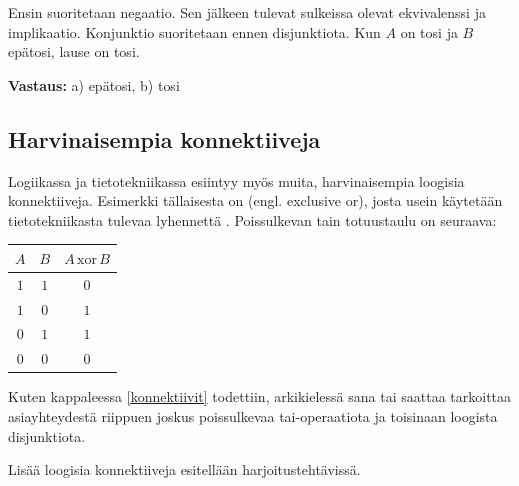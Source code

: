 \begin{esimerkki}
Ensin suoritetaan negaatio. Sen jälkeen tulevat sulkeissa olevat ekvivalenssi ja implikaatio. Konjunktio suoritetaan ennen disjunktiota. Kun $A$ on tosi ja $B$ epätosi, lause on tosi.

{\bf Vastaus:} a) epätosi, b) tosi
\end{esimerkki}

\newpage

\subsection*{Harvinaisempia konnektiiveja}
Logiikassa ja tietotekniikassa esiintyy myös muita, harvinaisempia loogisia konnektiiveja. Esimerkki tällaisesta on  (engl. exclusive or), josta usein käytetään tietotekniikasta tulevaa lyhennettä . Poissulkevan tain totuustaulu on seuraava:

\bigskip

\begin{center}
\begin{tabular}{|c|c|c|}\hline
$A$ & $B$ & $A\,\mathrm{xor}\,B$ \\ \hline
$1$ & $1$ & $0$\\ %
$1$ & $0$ & $1$\\
$0$ & $1$ & $1$\\
$0$ & $0$ & $0$\\ \hline
\end{tabular}
\end{center}

\bigskip

Kuten kappaleessa \ref{konnektiivit} todettiin, arkikielessä sana tai saattaa tarkoittaa asiayhteydestä riippuen joskus poissulkevaa tai-operaatiota ja toisinaan loogista disjunktiota.

Lisää loogisia konnektiiveja esitellään harjoitustehtävissä.




\Harjoitustehtavat

